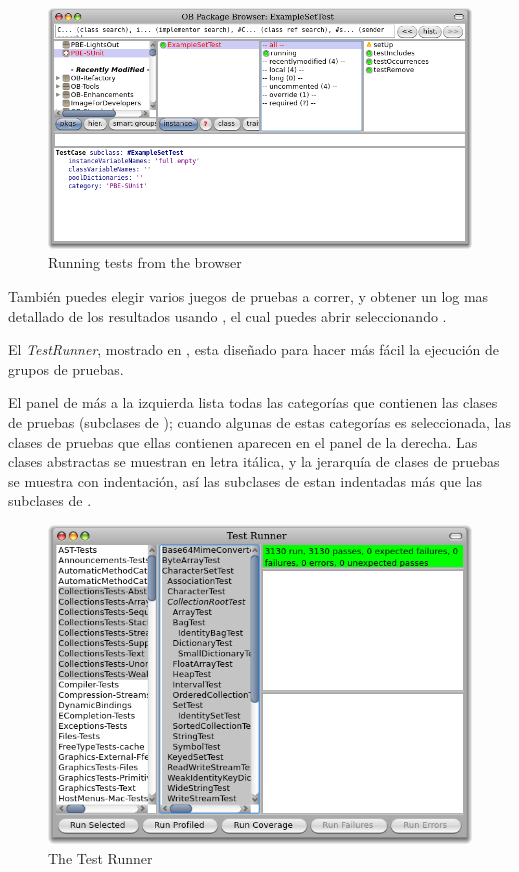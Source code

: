 \documentclass[a4paper,10pt,twoside]{book}
\begin{document}
\begin{figure}[tbh]
  \begin{center}
	\includegraphics[width=\linewidth]{browser-tests}
	\caption{Running \sunit tests from the browser}
  \end{center}
\end{figure}

Tambi\'en puedes elegir varios juegos de pruebas a correr, y obtener un log mas detallado de los resultados
usando \sunit {}, el cual puedes abrir seleccionando .


El \emph{TestRunner}, mostrado en , esta dise\~nado para hacer m\'as
f\'acil la ejecuci\'on de grupos de pruebas.

El panel de m\'as a la izquierda lista todas las categor\'ias que contienen las clases de pruebas
(\ie subclases de ); cuando algunas de estas categor\'ias es seleccionada, las clases de pruebas
que ellas contienen aparecen en el panel de la derecha.
Las clases abstractas se muestran en letra it\'alica, y la jerarqu\'ia de clases de pruebas se muestra con indentaci\'on, as\'i las subclases de  estan indentadas m\'as que las subclases de .


\begin{figure}[tbh]
  \begin{center}
	\includegraphics[width=\linewidth]{test-runner}
	\caption{The \pharo \sunit Test Runner}
  \end{center}
\end{figure}
\end{document}
